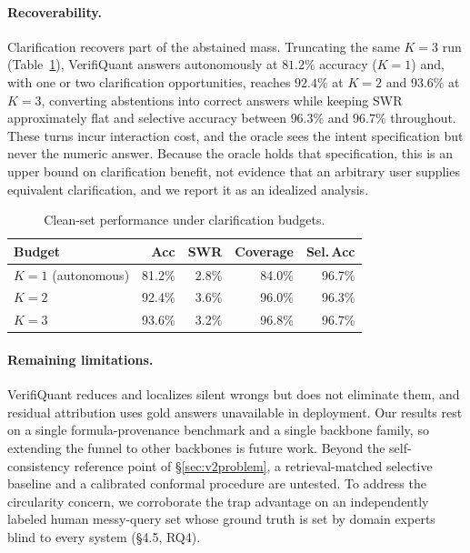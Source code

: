 \documentclass[sigconf,anonymous]{acmart}
\newcommand{\vqAccAll}{93.6\%}
\newcommand{\vqCovAll}{96.8\%}
\newcommand{\vqSelAccAll}{96.7\%}
\newcommand{\vqSWRAll}{3.2\%}
\begin{document}
\paragraph{Recoverability.}
Clarification recovers part of the abstained mass. Truncating the same $K{=}3$ run (Table~\ref{tab:v2kabl}), VerifiQuant answers autonomously at $81.2\%$ accuracy ($K{=}1$) and, with one or two clarification opportunities, reaches $92.4\%$ at $K{=}2$ and \vqAccAll{} at $K{=}3$, converting abstentions into correct answers while keeping SWR approximately flat and selective accuracy between $96.3\%$ and $96.7\%$ throughout. These turns incur interaction cost, and the oracle sees the intent specification but never the numeric answer. Because the oracle holds that specification, this is an upper bound on clarification benefit, not evidence that an arbitrary user supplies equivalent clarification, and we report it as an idealized analysis.

\begin{table}[t]
\caption{Clean-set performance under clarification budgets.}
\label{tab:v2kabl}
\small
\begin{tabular}{@{}lrrrr@{}}
\toprule
Budget & Acc & SWR & Coverage & Sel.\,Acc \\
\midrule
$K{=}1$ (autonomous) & 81.2\% & 2.8\% & 84.0\% & 96.7\% \\
$K{=}2$ & 92.4\% & 3.6\% & 96.0\% & 96.3\% \\
$K{=}3$ & \vqAccAll{} & \vqSWRAll{} & \vqCovAll{} & \vqSelAccAll{} \\
\bottomrule
\end{tabular}
\end{table}

\paragraph{Remaining limitations.}
VerifiQuant reduces and localizes silent wrongs but does not eliminate them, and residual attribution uses gold answers unavailable in deployment.
Our results rest on a single formula-provenance benchmark and a single backbone family, so extending the funnel to other backbones is future work.
Beyond the self-consistency reference point of \S\ref{sec:v2problem}, a retrieval-matched selective baseline and a calibrated conformal procedure are untested.
To address the circularity concern, we corroborate the trap advantage on an independently labeled human messy-query set whose ground truth is set by domain experts blind to every system (§4.5, RQ4).
\end{document}
